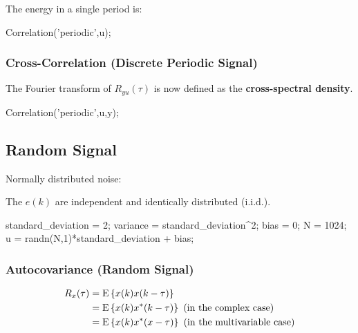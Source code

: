 \documentclass[10pt,a4paper]{scrartcl}
\begin{document}
\begin{multicols*}{2}
The energy in a single period is:


\begin{TPMatlab}
Correlation('periodic',u);
\end{TPMatlab}

\subsubsection{Cross-Correlation (Discrete Periodic Signal)}


The Fourier transform of $R_{yu}(\tau)$ is now defined as the \textbf{cross-spectral density}.


\begin{TPMatlab}
Correlation('periodic',u,y);
\end{TPMatlab}

\subsection{Random Signal}

Normally distributed noise:


The $e(k)$ are independent and identically distributed (i.i.d.).

\begin{TPMatlab}
standard_deviation = 2;
variance = standard_deviation^2;
bias = 0;
N = 1024;
u = randn(N,1)*standard_deviation + bias;
\end{TPMatlab}

\subsubsection{Autocovariance (Random Signal)}

\begin{align*}
R_x(\tau) &= \text{E}\left\{x(k)x(k-\tau)\right\}\\
&=\text{E}\left\{x(k)x^\ast(k-\tau)\right\} \text{ (in the complex case)}\\
&=\text{E}\left\{x(k)x^\ast(x-\tau)\right\} \text{ (in the multivariable case)}
\end{align*}


\end{multicols*}
\end{document}
